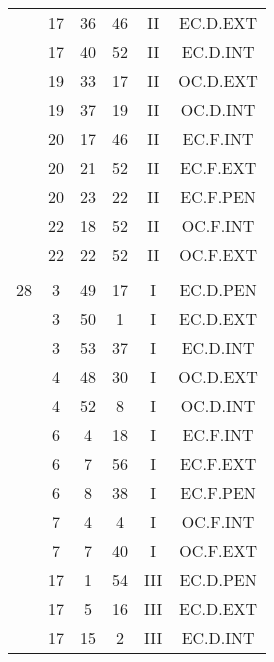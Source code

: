 \documentclass[12pt, a4paper]{article}
\begin{document}
\begin{multicols}{3}
{\begin{tabular}{c c c c c c}
	 	 	 	 & 17 & 36 & 46 & II & EC.D.EXT\\%
	 	 	 	 & 17 & 40 & 52 & II & EC.D.INT\\%
	 	 	 	 & 19 & 33 & 17 & II & OC.D.EXT\\%
	 	 	 	 & 19 & 37 & 19 & II & OC.D.INT\\%
	 	 	 	 & 20 & 17 & 46 & II & EC.F.INT\\%
	 	 	 	 & 20 & 21 & 52 & II & EC.F.EXT\\%
	 	 	 	 & 20 & 23 & 22 & II & EC.F.PEN\\%
	 	 	 	 & 22 & 18 & 52 & II & OC.F.INT\\%
	 	 	 	 & 22 & 22 & 52 & II & OC.F.EXT\\%
	 	 	 	 & & & & & \\%
	 	 	 	28 & 3 & 49 & 17 & I & EC.D.PEN\\%
	 	 	 	 & 3 & 50 & 1 & I & EC.D.EXT\\%
	 	 	 	 & 3 & 53 & 37 & I & EC.D.INT\\%
	 	 	 	 & 4 & 48 & 30 & I & OC.D.EXT\\%
	 	 	 	 & 4 & 52 & 8 & I & OC.D.INT\\%
	 	 	 	 & 6 & 4 & 18 & I & EC.F.INT\\%
	 	 	 	 & 6 & 7 & 56 & I & EC.F.EXT\\%
	 	 	 	 & 6 & 8 & 38 & I & EC.F.PEN\\%
	 	 	 	 & 7 & 4 & 4 & I & OC.F.INT\\%
	 	 	 	 & 7 & 7 & 40 & I & OC.F.EXT\\%
	 	 	 	 & 17 & 1 & 54 & III & EC.D.PEN\\%
	 	 	 	 & 17 & 5 & 16 & III & EC.D.EXT\\%
	 	 	 	 & 17 & 15 & 2 & III & EC.D.INT\\%

\end{tabular}}
\end{multicols}
\end{document}
